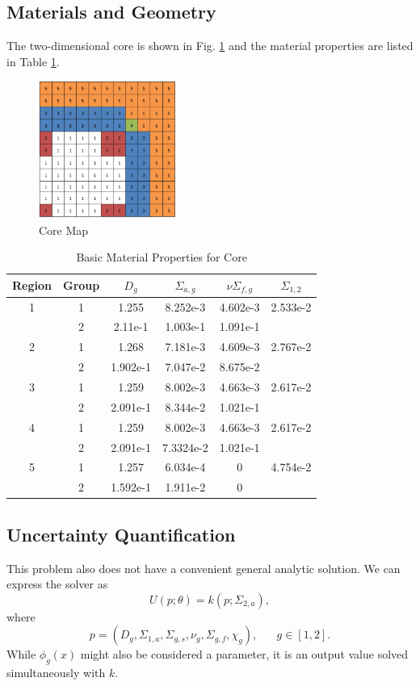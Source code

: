 \subsection{Materials and Geometry}
The two-dimensional core is shown in Fig. \ref{coremap} and the material properties are listed in Table \ref{tab:coremats}.
\begin{figure}[h]
\centering
   \includegraphics[width=0.4\textwidth]{../graphics/core}
   \caption{Core Map}
   \label{coremap}
\end{figure}
\begin{table}[h]
\centering
\begin{tabular}{c c | c c c c}
Region & Group & $D_g$ & $\Sigma_{a,g}$ & $\nu\Sigma_{f,g}$ & $\Sigma_{1,2}$ \\ \hline
1 & 1 & 1.255 & 8.252e-3 & 4.602e-3 & 2.533e-2 \\
 & 2 & 2.11e-1 & 1.003e-1 & 1.091e-1 & \\ \hline
2 & 1 & 1.268 & 7.181e-3 & 4.609e-3 & 2.767e-2 \\
 & 2 & 1.902e-1 & 7.047e-2 & 8.675e-2 & \\ \hline
3 & 1 & 1.259 & 8.002e-3 & 4.663e-3 & 2.617e-2 \\
 & 2 & 2.091e-1 & 8.344e-2 & 1.021e-1 & \\ \hline
4 & 1 & 1.259 & 8.002e-3 & 4.663e-3 & 2.617e-2 \\
 & 2 & 2.091e-1 & 7.3324e-2 & 1.021e-1 & \\ \hline
5 & 1 & 1.257 & 6.034e-4 & 0 & 4.754e-2 \\
 & 2 & 1.592e-1 & 1.911e-2 & 0 & 
\end{tabular}
\caption{Basic Material Properties for Core}
\label{tab:coremats}
\end{table}

\subsection{Uncertainty Quantification}
This problem also does not have a convenient general analytic solution.  We can express the solver as
\begin{equation}
U(p;\theta) = k(p;\Sigma_{2,a}),
\end{equation}
where
\begin{equation}
p=(D_g,\Sigma_{1,a},\Sigma_{g,s},\nu_g,\Sigma_{g,f},\chi_g),\hspace{20pt}g\in[1,2].
\end{equation}
While $\phi_g(x)$ might also be considered a parameter, it is an output value solved simultaneously with $k$.

